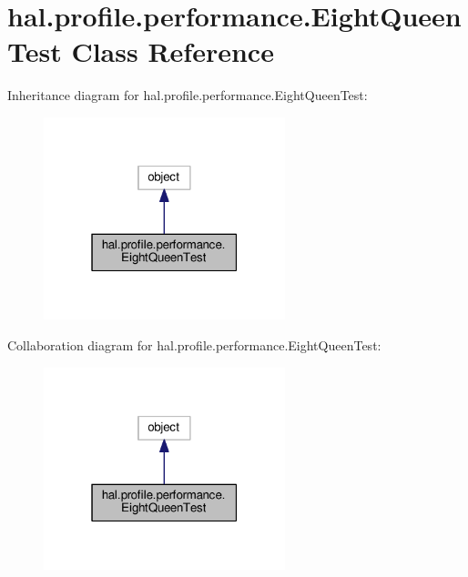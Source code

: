 \hypertarget{classhal_1_1profile_1_1performance_1_1_eight_queen_test}{}\section{hal.\+profile.\+performance.\+Eight\+Queen\+Test Class Reference}
\label{classhal_1_1profile_1_1performance_1_1_eight_queen_test}


Inheritance diagram for hal.\+profile.\+performance.\+Eight\+Queen\+Test\+:
\nopagebreak
\begin{figure}[H]
\begin{center}
\leavevmode
\includegraphics[width=199pt]{classhal_1_1profile_1_1performance_1_1_eight_queen_test__inherit__graph}
\end{center}
\end{figure}


Collaboration diagram for hal.\+profile.\+performance.\+Eight\+Queen\+Test\+:
\nopagebreak
\begin{figure}[H]
\begin{center}
\leavevmode
\includegraphics[width=199pt]{classhal_1_1profile_1_1performance_1_1_eight_queen_test__coll__graph}
\end{center}
\end{figure}
